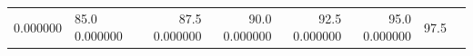 \begin{table}
\begin{tabular}{llrrrrrr}
0.000000 & 85.0%
0.000000 & 87.5%
0.000000 & 90.0%
0.000000 & 92.5%
0.000000 & 95.0%
0.000000 & 97.5%
\end{tabular}
\end{table}
